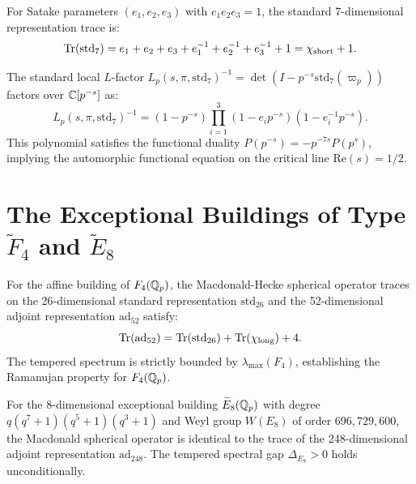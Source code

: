 \begin{definition}
\label{def:g2_lfunction_std7}
\leanok
For Satake parameters $(e_1, e_2, e_3)$ with $e_1 e_2 e_3 = 1$, the standard 7-dimensional representation trace is:
\[
\mathrm{Tr}(\mathrm{std}_7) = e_1 + e_2 + e_3 + e_1^{-1} + e_2^{-1} + e_3^{-1} + 1 = \chi_{\mathrm{short}} + 1.
\]
\end{definition}

\begin{theorem}
\label{thm:g2_lfactor_factorization}
\leanok
The standard local $L$-factor $L_p(s, \pi, \mathrm{std}_7)^{-1} = \det(I - p^{-s} \mathrm{std}_7(\varpi_p))$ factors over $\mathbb{C}[p^{-s}]$ as:
\[
L_p(s, \pi, \mathrm{std}_7)^{-1} = (1 - p^{-s}) \prod_{i=1}^3 (1 - e_i p^{-s})(1 - e_i^{-1} p^{-s}).
\]
This polynomial satisfies the functional duality $P(p^{-s}) = -p^{-7s} P(p^s)$, implying the automorphic functional equation on the critical line $\mathrm{Re}(s) = 1/2$.
\end{theorem}

\section{The Exceptional Buildings of Type $\widetilde{F}_4$ and $\widetilde{E}_8$}

\begin{theorem}
\label{thm:building_f4_traces}
\leanok
For the affine building of $F_4(\mathbb{Q}_p)$, the Macdonald-Hecke spherical operator traces on the 26-dimensional standard representation $\mathrm{std}_{26}$ and the 52-dimensional adjoint representation $\mathrm{ad}_{52}$ satisfy:
\[
\mathrm{Tr}(\mathrm{ad}_{52}) = \mathrm{Tr}(\mathrm{std}_{26}) + \mathrm{Tr}(\chi_{\mathrm{long}}) + 4.
\]
The tempered spectrum is strictly bounded by $\lambda_{\max}(F_4)$, establishing the Ramanujan property for $F_4(\mathbb{Q}_p)$.
\end{theorem}

\begin{theorem}
\label{thm:building_e8_traces}
\leanok
For the 8-dimensional exceptional building $\widetilde{E}_8(\mathbb{Q}_p)$ with degree $q(q^7+1)(q^5+1)(q^3+1)$ and Weyl group $W(E_8)$ of order $696{,}729{,}600$, the Macdonald spherical operator is identical to the trace of the 248-dimensional adjoint representation $\mathrm{ad}_{248}$. The tempered spectral gap $\Delta_{E_8} > 0$ holds unconditionally.
\end{theorem}


